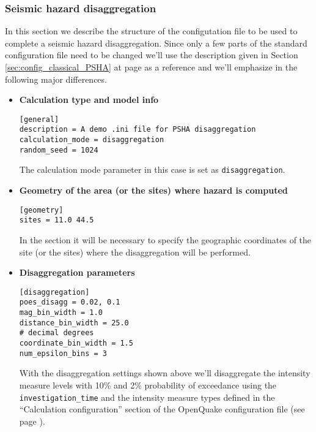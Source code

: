 \subsubsection{Seismic hazard disaggregation}
%
In this section we describe the structure of the configutation 
file to be used to complete a seismic hazard disaggregation. 
Since only a few parts of the standard configuration file need to 
be changed we'll use the description given in Section 
\ref{sec:config_classical_PSHA} at page 
\pageref{sec:config_classical_PSHA} as a reference and we'll 
emphasize in the following major differences.
%
\begin{itemize}
%
\item \textbf{Calculation type and model info}
\begin{Verbatim}[frame=single, commandchars=\\\{\}, fontsize=\small]
[general]
description = A demo .ini file for PSHA disaggregation
calculation_mode = disaggregation
random_seed = 1024
\end{Verbatim}
The calculation mode parameter in this case is set as 
\texttt{disaggregation}.
%
\item \textbf{Geometry of the area (or the sites) where hazard is computed}
\begin{Verbatim}[frame=single, commandchars=\\\{\}, fontsize=\small]
[geometry]
sites = 11.0 44.5
\end{Verbatim}

In the section it will be necessary to specify the geographic 
coordinates of the site (or the sites) where the disaggregation
will be performed.
%
\item \textbf{Disaggregation parameters}
\begin{Verbatim}[frame=single, commandchars=\\\{\}, fontsize=\small]
[disaggregation]
poes_disagg = 0.02, 0.1
mag_bin_width = 1.0
distance_bin_width = 25.0
# decimal degrees
coordinate_bin_width = 1.5
num_epsilon_bins = 3
\end{Verbatim}
With the disaggregation settings shown above we'll disaggregate the intensity
measure levels with 10\% and 2\% probability of exceedance using the
\texttt{in\-ves\-ti\-gation\_time} and the intensity measure types 
defined in the ``Calculation configuration'' section of the OpenQuake
configuration file (see page \pageref{sec:calculation_configuration}). 
\end{itemize}